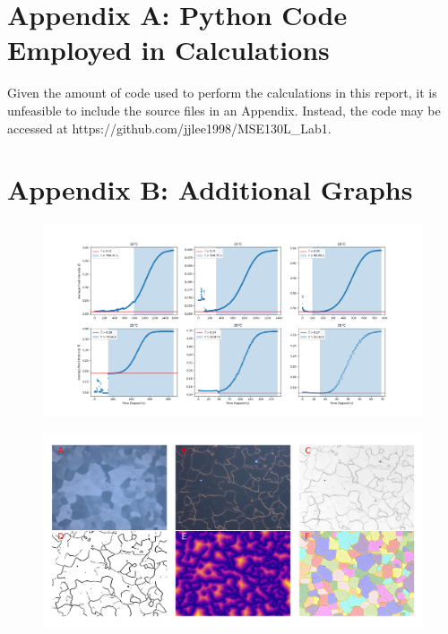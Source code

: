 \documentclass[12pt, titlepage]{article}
\begin{document}
\printbibliography[heading=bibnumbered]

\section{Appendix A: Python Code Employed in Calculations}

Given the amount of code used to perform the calculations in this report, it is unfeasible to include the source files in an Appendix.  Instead, the code may be accessed at https://github.com/jjlee1998/MSE130L_Lab1.

\section{Appendix B: Additional Graphs}

	\begin{figure}[h]
		\centering
		\includegraphics[width=1.0\linewidth]{jmak_2.png}
		\caption{}
		\label{fig:jmak_2}
	\end{figure}

	\begin{figure}[h]
		\centering
		\includegraphics[width=1.0\linewidth]{microstructure_0C.png}
		\caption{}
		\label{fig:micro_0C}
	\end{figure}
\end{document}
